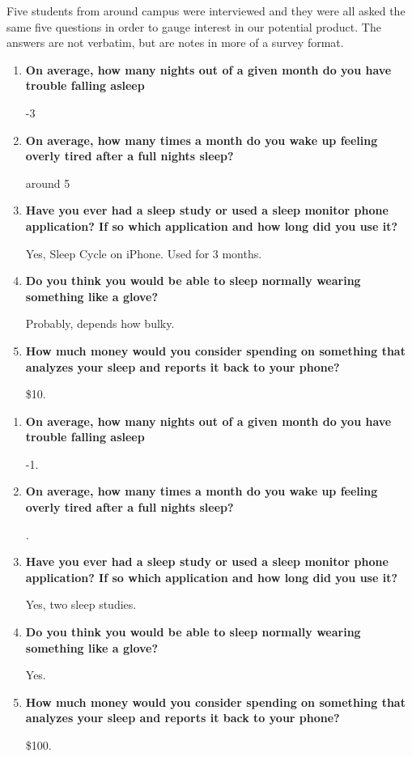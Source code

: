 \documentclass[finalProposal.tex]{subfiles}
\begin{document}
\onehalfspacing


\bigskip

Five students from around campus were interviewed and they were all asked the same five questions in order to gauge interest in our potential product. The answers are not verbatim, but are notes in more of a survey format.

\bigskip

\begin{enumerate}
    \item {\bf{On average, how many nights out of a given month do you have trouble falling asleep}}

-3
\smallskip

    \item {\bf{On average, how many times a month do you wake up feeling overly tired after a full nights sleep?}}

\smallskip
around 5
\smallskip
    \item {\bf{Have you ever had a sleep study or used a sleep monitor phone application? If so which application and how long did you use it?}}

\smallskip
Yes, Sleep Cycle on iPhone. Used for 3 months.
\smallskip
    \item {\bf{Do you think you would be able to sleep normally wearing something like a glove?}}

\smallskip
Probably, depends how bulky.
\smallskip
    \item {\bf{How much money would you consider spending on something that analyzes your sleep and reports it back to your phone?}}

\smallskip
\$10.
\smallskip
\end{enumerate}

\bigskip

\begin{enumerate}
    \item {\bf{On average, how many nights out of a given month do you have trouble falling asleep}}

-1.
\smallskip
    \item {\bf{On average, how many times a month do you wake up feeling overly tired after a full nights sleep?}}

.
\smallskip
    \item {\bf{Have you ever had a sleep study or used a sleep monitor phone application? If so which application and how long did you use it?}}

\smallskip
Yes, two sleep studies.
\smallskip
    \item {\bf{Do you think you would be able to sleep normally wearing something like a glove?}}

\smallskip
Yes.
\smallskip
    \item {\bf{How much money would you consider spending on something that analyzes your sleep and reports it back to your phone?}}

\smallskip
\$100.
\smallskip
\end{enumerate}
\end{document}
